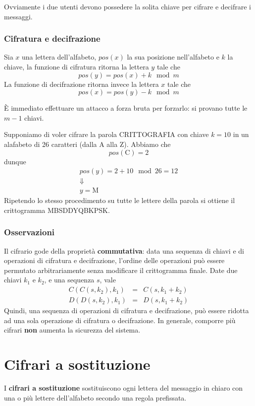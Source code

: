Ovviamente i due utenti devono possedere la solita chiave per cifrare e decifrare i messaggi.

\subsubsection{Cifratura e decifrazione}
Sia $x$ una lettera dell'alfabeto, $pos(x)$ la sua posizione nell'alfabeto e $k$ la chiave, la funzione di cifratura
ritorna la lettera $y$ tale che
\[ pos(y) = pos(x) + k \mod{m} \]
La funzione di decifrazione ritorna invece la lettera $x$ tale che
\[ pos(x) = pos(y) - k \mod{m} \]

\`E immediato effettuare un attacco a forza bruta per forzarlo: si provano tutte le $m - 1$ chiavi.

\begin{example}
	Supponiamo di voler cifrare la parola CRITTOGRAFIA con chiave $k = 10$ in un alafabeto di 26 caratteri (dalla A alla
	Z). Abbiamo che
	\[ pos(\text{C}) = 2 \]
	dunque
	\begin{gather*}
		pos(y) = 2 + 10 \mod{26} = 12 \\
		\Downarrow \\
		y = \text{M}
	\end{gather*}
	Ripetendo lo stesso procedimento su tutte le lettere della parola si ottiene il crittogramma MBSDDYQBKPSK.
\end{example}

\subsubsection{Osservazioni}
Il cifrario gode della propriet\`a \textbf{commutativa}: data una sequenza di chiavi e di operazioni di cifratura e
decifrazione, l'ordine delle operazioni pu\`o essere permutato arbitrariamente senza modificare il crittogramma finale.
Date due chiavi $k_1$ e $k_2$, e una sequenza $s$, vale
\[
	\begin{matrix}
		C(C(s, k_2), k_1) & = & C(s, k_1 + k_2) \\
		D(D(s, k_2), k_1) & = & D(s, k_1 + k_2)
	\end{matrix}
\]
Quindi, una sequenza di operazioni di cifratura e decifrazione, pu\`o essere ridotta ad una sola operazione di cifratura
o decifrazione. In generale, comporre pi\`u cifrari \textbf{non} aumenta la sicurezza del sistema.

\section{Cifrari a sostituzione}\label{sostituzione}
I \textbf{cifrari a sostituzione} sostituiscono ogni lettera del messaggio in chiaro con una o pi\`u lettere
dell'alfabeto secondo una regola prefissata.

